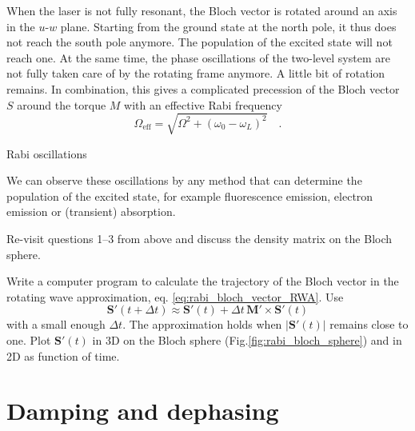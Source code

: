 When the laser is not fully resonant, the Bloch vector is rotated around an axis in the $u$-$w$ plane. Starting from the ground state at the north pole, it thus does not reach the south pole anymore. The population of the excited state will  not reach one. At the same time, the phase oscillations of the two-level system are not fully taken care of by the rotating frame anymore. A little bit of rotation remains. In combination, this gives a complicated precession of the Bloch vector $S$ around the torque $M$ with an effective Rabi frequency 
\begin{equation}
 \Omega_\text{eff} = \sqrt{\Omega^2 + (\omega_0 - \omega_L)^2 } \quad .
\end{equation}

\begin{marginfigure} 
    \caption{Rabi oscillations}
    \label{fig:Rabi}
\end{marginfigure}

We can observe these oscillations by any method that can determine the population of the excited state, for example fluorescence emission, electron emission or (transient) absorption.



\begin{questions}

\item Re-visit questions 1--3 from above and discuss the density matrix on the Bloch sphere.

\item Write a computer program to calculate the trajectory of the Bloch vector in the rotating wave approximation, eq. \ref{eq:rabi_bloch_vector_RWA}. Use
\begin{equation*}
 \boldsymbol{S}'(t + \Delta t) \approx  \boldsymbol{S}'(t ) + \Delta t \,  \boldsymbol{M}'   \times \boldsymbol{S}' (t)
\end{equation*}
with a small enough $\Delta t$. The approximation holds when $|\boldsymbol{S}' (t)| $ remains close to one. Plot $\boldsymbol{S}' (t)$ in 3D on the Bloch sphere (Fig.\ref{fig:rabi_bloch_sphere}) and in 2D as function of time.

\end{questions}

\section{Damping and dephasing}


